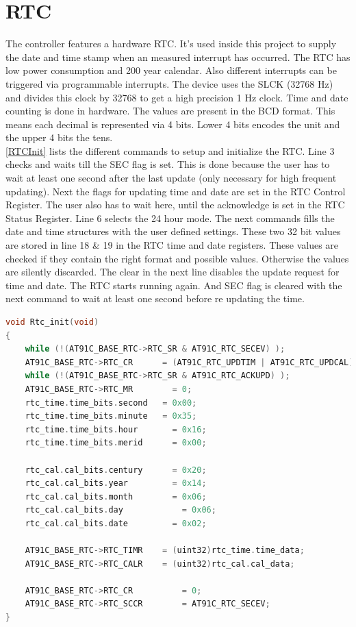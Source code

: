 \section{\acs{RTC}}
\label{RTCchapter} 
The controller features a hardware \acf{RTC}. It's used inside this project to supply the date and time stamp when an measured interrupt has occurred. The \ac{RTC} has low power consumption and 200 year calendar. Also different interrupts can be triggered via programmable interrupts. The device uses the SLCK (32768 Hz) and divides this clock by 32768 to get a high precision 1 Hz clock. Time and date counting is done in hardware. The values are present in the \acf{BCD} format. This means each decimal is represented via 4 bits. Lower 4 bits encodes the unit and the upper 4 bits the tens.\cite{AT91RTC}\\
\autoref{RTCInit} lists the different commands to setup and initialize the \acs{RTC}. Line 3 checks and waits till the SEC flag is set. This is done because the user has to wait at least one second after the last update (only necessary for high frequent updating). Next the flags for updating time and date are set in the \acs{RTC} Control Register. The user also has to wait here, until the acknowledge is set in the \acs{RTC} Status Register. Line 6 selects the 24 hour mode. The next commands fills the date and time structures with the user defined settings. These two 32 bit values are stored in line 18 \& 19 in the \ac{RTC} time and date registers. These values are checked if they contain the right format and possible values. Otherwise the values are silently discarded. The clear in the next line disables the update request for time and date. The \ac{RTC} starts running again. And SEC flag is cleared with the next command to wait at least one second before re updating the time.\cite{AT91RTC}\\

\begin{lstlisting}[language=C, caption={Minimal \acs{RTC} initialization}, label={RTCInit}]
void Rtc_init(void) 
{	
	while (!(AT91C_BASE_RTC->RTC_SR & AT91C_RTC_SECEV) ); 
	AT91C_BASE_RTC->RTC_CR      = (AT91C_RTC_UPDTIM | AT91C_RTC_UPDCAL); 
	while (!(AT91C_BASE_RTC->RTC_SR & AT91C_RTC_ACKUPD) ); 
	AT91C_BASE_RTC->RTC_MR 		  = 0;         	
	rtc_time.time_bits.second 	= 0x00; 
	rtc_time.time_bits.minute 	= 0x35; 
	rtc_time.time_bits.hour 	  = 0x16; 
	rtc_time.time_bits.merid 	  = 0x00;
	
	rtc_cal.cal_bits.century 	  = 0x20; 
	rtc_cal.cal_bits.year 		  = 0x14; 
	rtc_cal.cal_bits.month 		  = 0x06; 
	rtc_cal.cal_bits.day 		    = 0x06; 
	rtc_cal.cal_bits.date 		  = 0x02;
	
	AT91C_BASE_RTC->RTC_TIMR    = (uint32)rtc_time.time_data;	
	AT91C_BASE_RTC->RTC_CALR    = (uint32)rtc_cal.cal_data;
	
	AT91C_BASE_RTC->RTC_CR 			= 0; 			
	AT91C_BASE_RTC->RTC_SCCR 		= AT91C_RTC_SECEV; 
}
\end{lstlisting}




